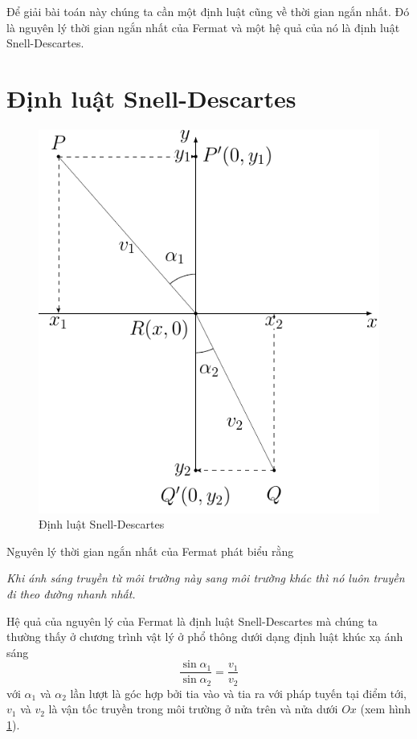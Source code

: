 Để giải bài toán này chúng ta cần một định luật cũng về thời gian ngắn nhất. Đó là nguyên lý thời gian ngắn nhất của Fermat và một hệ quả của nó là định luật Snell-Descartes.

\section*{Định luật Snell-Descartes}

\begin{figure}[ht]
    \centering
    \includegraphics{brachistochrone/fermat.pdf}
    \caption{Định luật Snell-Descartes}
    \label{cycloid:snell}
\end{figure}

Nguyên lý thời gian ngắn nhất của Fermat phát biểu rằng

\textit{Khi ánh sáng truyền từ môi trường này sang môi trường khác thì nó luôn truyền đi theo đường nhanh nhất.}

Hệ quả của nguyên lý của Fermat là định luật Snell-Descartes mà chúng ta thường thấy ở chương trình vật lý ở phổ thông dưới dạng định luật khúc xạ ánh sáng
\begin{equation}
    \frac{\sin \alpha_1}{\sin \alpha_2} = \frac{v_1}{v_2}
\end{equation}
với $\alpha_1$ và $\alpha_2$ lần lượt là góc hợp bởi tia vào và tia ra với pháp tuyến tại điểm tới, $v_1$ và $v_2$ là vận tốc truyền trong môi trường ở nửa trên và nửa dưới $Ox$ (xem hình \ref{cycloid:snell}).

